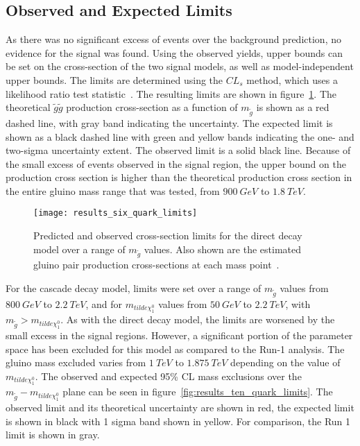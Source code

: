 \subsection{Observed and Expected Limits}\label{subsec:results_limits}

As there was no significant excess of events over the background prediction, no evidence for the signal was found.
Using the observed yields, upper bounds can be set on the cross-section of the two signal models, as well as model-independent upper bounds.
The limits are determined using the $CL_s$ method, which uses a likelihood ratio test statistic~\cite{results-stats-cls}.
The resulting limits are shown in figure~\ref{fig:results_six_quark_limits}.
The theoretical $\tilde{g}\tilde{g}$ production cross-section as a function of $m_{\tilde{g}}$ is shown as a red dashed line, with gray band indicating the uncertainty.
The expected limit is shown as a black dashed line with green and yellow bands indicating the one- and two-sigma uncertainty extent.
The observed limit is a solid black line.
Because of the small excess of events observed in the signal region, the upper bound on the production cross section is higher than the theoretical production cross section in the entire gluino mass range that was tested, from $900~GeV$ to $1.8~TeV$.

\begin{figure}[!ht]
    \centering
    \texttt{[image: results\_six\_quark\_limits]}
    \caption{Predicted and observed cross-section limits for the direct decay model over a range of $m_{\tilde{g}}$ values.
    Also shown are the estimated gluino pair production cross-sections at each mass point~\cite{paper-plb}.}
\label{fig:results_six_quark_limits}
\end{figure}

For the cascade decay model, limits were set over a range of $m_{\tilde{g}}$ values from $800~GeV$ to $2.2~TeV$, and for $m_{tilde{\chi}_1^0}$ values from $50~GeV$ to $2.2~TeV$, with $m_{\tilde{g}} > m_{tilde{\chi}_1^0}$.
As with the direct decay model, the limits are worsened by the small excess in the signal regions.
However, a significant portion of the parameter space has been excluded for this model as compared to the Run-1 analysis.
The gluino mass excluded varies from $1~TeV$ to $1.875~TeV$ depending on the value of $m_{tilde{\chi}_1^0}$.
The observed and expected 95\% CL mass exclusions over the  $m_{\tilde{g}} - m_{tilde{\chi}_1^0}$ plane can be seen in figure~\ref{fig:results_ten_quark_limits}.
The observed limit and its theoretical uncertainty are shown in red, the expected limit is shown in black with 1 sigma band shown in yellow.
For comparison, the Run 1 limit is shown in gray.

